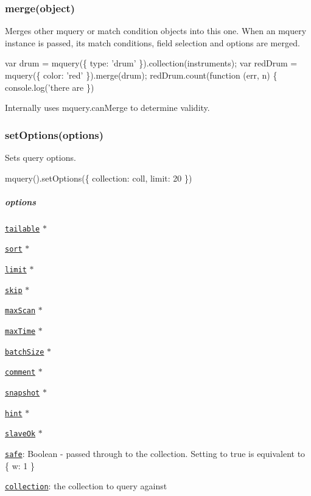\subsubsection*{merge(object)}

Merges other mquery or match condition objects into this one. When an mquery instance is passed, its match conditions, field selection and options are merged.


\begin{DoxyCode}
var drum = mquery(\{ type: 'drum' \}).collection(instruments);
var redDrum = mquery(\{ color: 'red' \}).merge(drum);
redDrum.count(function (err, n) \{
  console.log('there are %
\})
\end{DoxyCode}


Internally uses {\ttfamily mquery.\+can\+Merge} to determine validity.

\subsubsection*{set\+Options(options)}

Sets query options.


\begin{DoxyCode}
mquery().setOptions(\{ collection: coll, limit: 20 \})
\end{DoxyCode}


\subparagraph*{options}


\begin{DoxyItemize}
\item \href{#tailable}{\tt tailable} $\ast$
\item \href{#sort}{\tt sort} $\ast$
\item \href{#limit}{\tt limit} $\ast$
\item \href{#skip}{\tt skip} $\ast$
\item \href{#maxscan}{\tt max\+Scan} $\ast$
\item \href{#maxtime}{\tt max\+Time} $\ast$
\item \href{#batchSize}{\tt batch\+Size} $\ast$
\item \href{#comment}{\tt comment} $\ast$
\item \href{#snapshot}{\tt snapshot} $\ast$
\item \href{#hint}{\tt hint} $\ast$
\item \href{#slaveOk}{\tt slave\+Ok} $\ast$
\item \href{http://docs.mongodb.org/manual/reference/write-concern/}{\tt safe}\+: Boolean -\/ passed through to the collection. Setting to {\ttfamily true} is equivalent to {\ttfamily \{ w\+: 1 \}}
\item \href{#collection}{\tt collection}\+: the collection to query against
\end{DoxyItemize}

